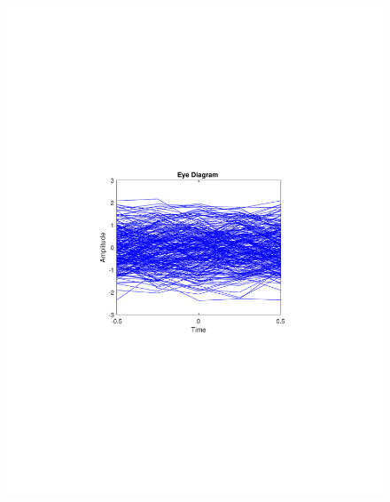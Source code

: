 \begin{refsection}
\begin{figure}[H]
\begin{minipage}{0.30\textwidth}
		\includegraphics[clip, trim=4cm 8cm 4cm 8cm, width=1\textwidth]{./sdf/m_qam_system/figures/expResults/intradyne/2_eye_4GBdInSig13dB_AfMF.pdf}
		\label{fig:4GBdSpecMF}
	\end{minipage}
	\begin{minipage}{0.30\textwidth}
		\centering

\end{minipage}
\end{figure}
\end{refsection}
